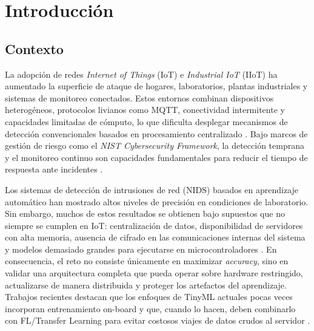 \chapter{Introducción}
\label{chap:Introduction}

\section{Contexto}

La adopción de redes \textit{Internet of Things} (IoT) e \textit{Industrial IoT} (IIoT) ha aumentado la superficie de ataque de hogares, laboratorios, plantas industriales y sistemas de monitoreo conectados. Estos entornos combinan dispositivos heterogéneos, protocolos livianos como MQTT, conectividad intermitente y capacidades limitadas de cómputo, lo que dificulta desplegar mecanismos de detección convencionales basados en procesamiento centralizado \cite{Amanullah2020_DL_BigData_IoT_Security, Ni2024_IIoT_Security_Survey}. Bajo marcos de gestión de riesgo como el \textit{NIST Cybersecurity Framework}, la detección temprana y el monitoreo continuo son capacidades fundamentales para reducir el tiempo de respuesta ante incidentes \cite{NISTCSF2024}.

Los sistemas de detección de intrusiones de red (NIDS) basados en aprendizaje automático han mostrado altos niveles de precisión en condiciones de laboratorio. Sin embargo, muchos de estos resultados se obtienen bajo supuestos que no siempre se cumplen en IoT: centralización de datos, disponibilidad de servidores con alta memoria, ausencia de cifrado en las comunicaciones internas del sistema y modelos demasiado grandes para ejecutarse en microcontroladores \cite{Bagaa2020_ML_IoT_Framework, Dini2024_EmbeddedIIoT_Review}. En consecuencia, el reto no consiste únicamente en maximizar \textit{accuracy}, sino en validar una arquitectura completa que pueda operar sobre hardware restringido, actualizarse de manera distribuida y proteger los artefactos del aprendizaje. Trabajos recientes destacan que los enfoques de TinyML actuales pocas veces incorporan entrenamiento on-board y que, cuando lo hacen, deben combinarlo con FL/Transfer Learning para evitar costosos viajes de datos crudos al servidor \cite{Ficco2024_FL_TinyML_Onboard, Ramadan2025}.

